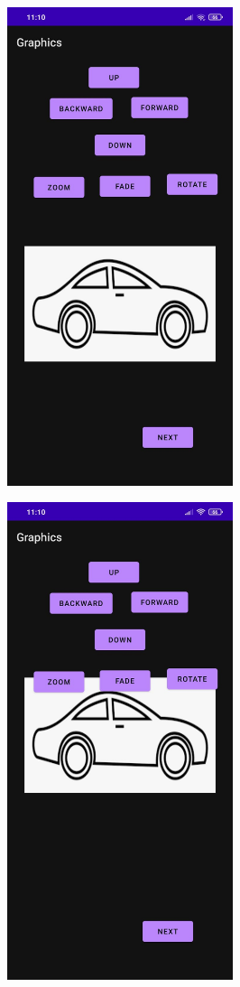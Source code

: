 \documentclass[12pt,letterpaper]{article}
\begin{document}
\newpage
\subsection*{}
\begin{figure}[h]
    \centering
    \includegraphics[height=14cm, keepaspectratio]{Outputs/OP1.jpeg}
\end{figure}
\begin{figure}
    \centering
    \includegraphics[height=14cm, keepaspectratio]{Outputs/OP2.jpeg}
\end{figure}
\end{document}
